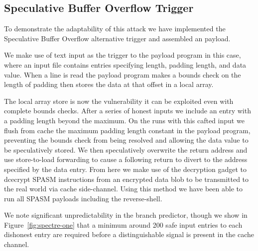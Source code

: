 \subsection{Speculative Buffer Overflow Trigger}
\label{subsec:openssl-impl}

\FigSpectreOne

To demonstrate the adaptability of this attack we have implemented the 
Speculative Buffer Overflow alternative trigger and assembled an \speculake 
payload. 

We make use of text input as the trigger to the payload program in this case,
where an input file contains entries specifying length, padding length,
and data value. When a line is read the payload program makes a bounds
check on the length of padding then stores the data at that offset in a
local array. 

The local array store is now the vulnerability it can be exploited even 
with complete bounds checks. After a series of honest inputs we include 
an entry with a padding length beyond the maximum. On the runs with this
cafted input we flush from cache the maximum padding length constant in 
the payload program, preventing the bounds check from being resolved 
and allowing the data value to be speculatively stored. We 
then speculatively overwrite the return address and use store-to-load forwarding
to cause a following return to divert to the address specified by the data entry. 
From here we make use of the decryption gadget to dcecrypt SPASM instructions
from an encrypted data blob to be transmitted to the real world via cache 
side-channel. Using this method we have been able to run all SPASM payloads 
including the reverse-shell. 

We note significant unpredictability in the branch predictor, though we
show in Figure~\ref{fig:spectre-one} that a minimum around 200 safe input entries
to each dishonest entry are required before a distinguishable signal is present 
in the cache channel. 

